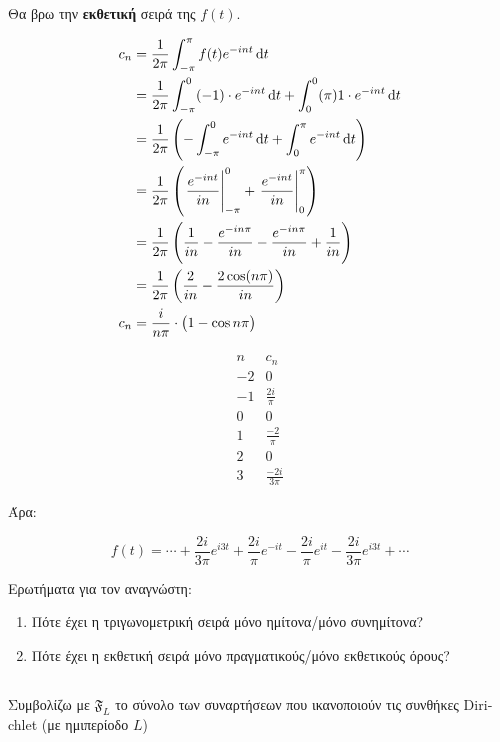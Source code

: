 \documentclass[11pt,a4paper,titlepage,draft]{article}
\begin{document}
Θα βρω την \textbf{εκθετική} σειρά της \(f(t)\).

\begin{align*}
c_n &= \frac{1}{2\pi}
\int_{-\pi}^\pi f(t)e^{-int}\dif t \\
&=
\frac{1}{2\pi}
\int_{-\pi}^0(-1)\cdot e^{-int} \dif t
+
\int_{0}^0(\pi)1\cdot e^{-int} \dif t
\\ &=
\frac{1}{2\pi}
\left(
- \int_{-\pi}^0e^{-int}\dif t
+ \int_0^\pi e^{-int} \dif t
\right)
\\ &=
\frac{1}{2\pi}
\left(
 \left. \frac{e^{-int}}{in} \right|_{-\pi}^0
+ \left. \frac{e^{-int}}{in} \right|_0^\pi
\right)
\\ &=
\frac{1}{2\pi} \left(
\frac{1}{in} - \frac{e^{-in\pi}}{in} - \frac{e^{-in\pi}}{in} + \frac{1}{in}
\right)
\\ &=
\frac{1}{2\pi}
\left(
\frac{2}{in}
- \frac{2\cos (n \pi)}{in}
\right)
\\ c_n &=
\frac{i}{n\pi}
\cdot \big(
1-\cos n\pi
\big)
\end{align*}

\[
\begin{array}{r|l}
n & c_n \\
-2 & 0 \\
-1 & \frac{2i}{\pi} \\
0 & 0 \\
1 & \frac{-2}{\pi} \\
2 & 0 \\
3 & \frac{-2i}{3\pi}
\end{array}
\]

Άρα:

\[
f(t) = \cdots + \frac{2i}{3\pi} e^{i3t} + \frac{2i}{\pi} e^{-it}
- \frac{2i}{\pi} e^{it}
- \frac{2i}{3\pi} e^{i3t} + \cdots
\]

Ερωτήματα για τον αναγνώστη:
\begin{enumerate}
\item
Πότε έχει η τριγωνομετρική σειρά μόνο ημίτονα/μόνο συνημίτονα?
\item
Πότε έχει η εκθετική σειρά μόνο πραγματικούς/μόνο εκθετικούς όρους?
\end{enumerate}

\subsection{}
\begin{defn*}{}
Συμβολίζω με \(\mathfrak{F}_L\) το σύνολο των συναρτήσεων που ικανοποιούν τις συνθήκες \textlatin{Dirichlet} (με ημιπερίοδο \(L\))
\end{defn*}
\end{document}
